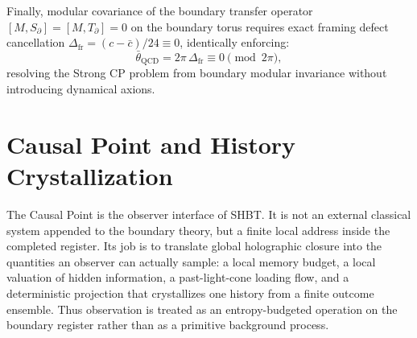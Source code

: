 \documentclass[11pt,letterpaper]{article}
\theoremstyle{plain}
\begin{document}
Finally, modular covariance of the boundary transfer operator $[M, S_\partial] = [M, T_\partial] = 0$ on the boundary torus requires exact framing defect cancellation $\Delta_{\mathrm{fr}} = (c - \bar{c})/24 \equiv 0$, identically enforcing:
\begin{equation}
\bar{\theta}_{\mathrm{QCD}} = 2\pi \, \Delta_{\mathrm{fr}} \equiv 0 \pmod{2\pi},
\end{equation}
resolving the Strong CP problem from boundary modular invariance without introducing dynamical axions.


\section{Causal Point and History Crystallization}
\label{sec:causal-point-history-crystallization}

The Causal Point is the observer interface of SHBT.  It is not an external
classical system appended to the boundary theory, but a finite local address
inside the completed register.  Its job is to translate global holographic
closure into the quantities an observer can actually sample: a local memory
budget, a local valuation of hidden information, a past-light-cone loading
flow, and a deterministic projection that crystallizes one history from a
finite outcome ensemble.  Thus observation is treated as an entropy-budgeted
operation on the boundary register rather than as a primitive background
process.
\end{document}

